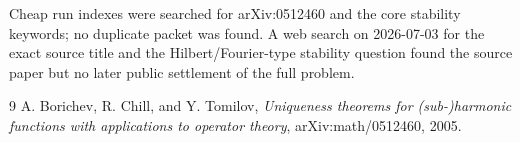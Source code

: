 \documentclass[11pt]{article}
\begin{document}
Cheap run indexes were searched for arXiv:0512460 and the core stability
keywords; no duplicate packet was found.  A web search on 2026-07-03 for the
exact source title and the Hilbert/Fourier-type stability question found the
source paper but no later public settlement of the full problem.

\begin{thebibliography}{9}
A. Borichev, R. Chill, and Y. Tomilov,
\emph{Uniqueness theorems for (sub-)harmonic functions with applications to
operator theory}, arXiv:math/0512460, 2005.
\end{thebibliography}
\end{document}
